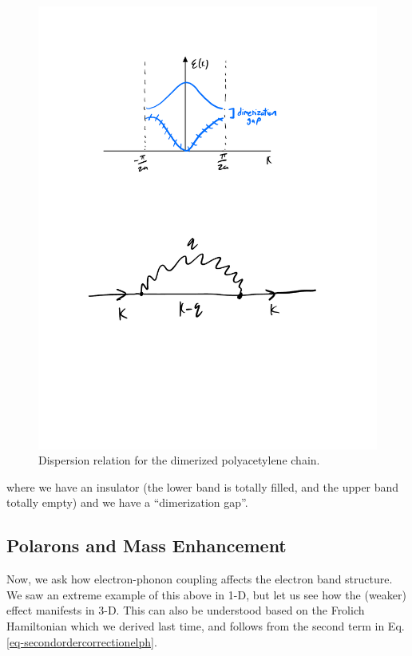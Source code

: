 \begin{figure}[htbp]
    \centering
    \includegraphics[scale=0.6]{Images/fig-polyacedimersizeddispersion.pdf}
    \caption{Dispersion relation for the dimerized polyacetylene chain.}
    \label{fig-polyacedimersizeddispersion}
\end{figure}

where we have an insulator (the lower band is totally filled, and the upper band totally empty) and we have a ``dimerization gap''.

\subsection{Polarons and Mass Enhancement}
Now, we ask how electron-phonon coupling affects the electron band structure. We saw an extreme example of this above in 1-D, but let us see how the (weaker) effect manifests in 3-D. This can also be understood based on the Frolich Hamiltonian which we derived last time, and follows from the second term in Eq. \eqref{eq-secondordercorrectionelph}.

